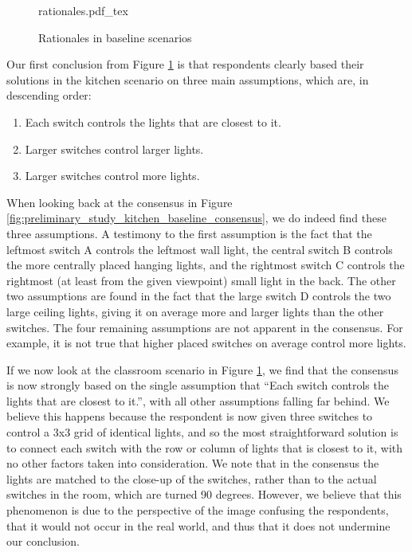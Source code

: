 \begin{figure}
    \centering
    \def\svgwidth{\columnwidth}
    {rationales.pdf_tex}
    \caption{Rationales in baseline scenarios}
    \label{fig:preliminary_study_rationales}
\end{figure}

Our first conclusion from Figure \ref{fig:preliminary_study_rationales} is that respondents clearly based their solutions in the kitchen scenario on three main assumptions, which are, in descending order:

\begin{enumerate}
    \item Each switch controls the lights that are closest to it.
    \item Larger switches control larger lights.
    \item Larger switches control more lights.
\end{enumerate}

When looking back at the consensus in Figure \ref{fig:preliminary_study_kitchen_baseline_consensus}, we do indeed find these three assumptions. A testimony to the first assumption is the fact that the leftmost switch A controls the leftmost wall light, the central switch B controls the more centrally placed hanging lights, and the rightmost switch C controls the rightmost (at least from the given viewpoint) small light in the back. The other two assumptions are found in the fact that the large switch D controls the two large ceiling lights, giving it on average more and larger lights than the other switches. The four remaining assumptions are not apparent in the consensus. For example, it is not true that higher placed switches on average control more lights.


If we now look at the classroom scenario in Figure \ref{fig:preliminary_study_rationales}, we find that the consensus is now strongly based on the single assumption that ``Each switch controls the lights that are closest to it.'', with all other assumptions falling far behind. We believe this happens because the respondent is now given three switches to control a 3x3 grid of identical lights, and so the most straightforward solution is to connect each switch with the row or column of lights that is closest to it, with no other factors taken into consideration. We note that in the consensus the lights are matched to the close-up of the switches, rather than to the actual switches in the room, which are turned 90 degrees. However, we believe that this phenomenon is due to the perspective of the image confusing the respondents, that it would not occur in the real world, and thus that it does not undermine our conclusion.

